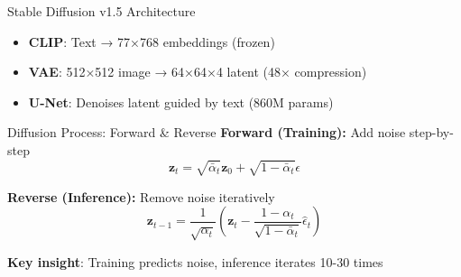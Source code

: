 \documentclass{beamer}
\begin{document}
\begin{frame}{Stable Diffusion v1.5 Architecture}
\begin{center}
\end{center}

\begin{itemize}
    \item \textbf{CLIP}: Text → 77×768 embeddings (frozen)
    \item \textbf{VAE}: 512×512 image → 64×64×4 latent (48× compression)
    \item \textbf{U-Net}: Denoises latent guided by text (860M params)
\end{itemize}
\end{frame}

\begin{frame}{Diffusion Process: Forward \& Reverse}
\textbf{Forward (Training):} Add noise step-by-step
\begin{equation}
\mathbf{z}_t = \sqrt{\bar{\alpha}_t} \mathbf{z}_0 + \sqrt{1-\bar{\alpha}_t} \epsilon
\end{equation}

\textbf{Reverse (Inference):} Remove noise iteratively
\begin{equation}
\mathbf{z}_{t-1} = \frac{1}{\sqrt{\alpha_t}}(\mathbf{z}_t - \frac{1-\alpha_t}{\sqrt{1-\bar{\alpha}_t}} \hat{\epsilon}_t)
\end{equation}

\begin{center}
\textbf{Key insight}: Training predicts noise, inference iterates 10-30 times
\end{center}
\end{frame}
\end{document}
